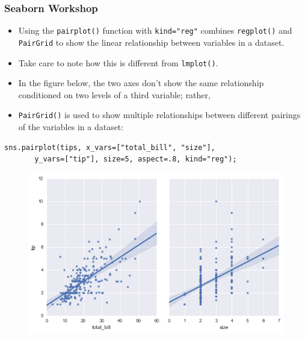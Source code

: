 \documentclass{beamer}
\begin{document}
\begin{frame}[fragile]
	\frametitle{Seaborn Workshop}
	\large
\begin{itemize}
\item Using the \texttt{pairplot()} function with \texttt{kind="reg"} combines \texttt{regplot()} and \texttt{PairGrid} to show the linear relationship between variables in a dataset.
\item Take care to note how this is different from \texttt{lmplot()}. 
\item In the figure below, the two axes don’t show the same relationship conditioned on two levels of a third variable; rather, \item \texttt{PairGrid()} is used to show multiple relationships between different pairings of the variables in a dataset:
\end{itemize}

\end{frame}
\begin{frame}[fragile]
	\large
\begin{verbatim}
sns.pairplot(tips, x_vars=["total_bill", "size"],  
       y_vars=["tip"], size=5, aspect=.8, kind="reg");
\end{verbatim}
\begin{figure}
\centering
\includegraphics[width=0.8\linewidth]{images/regression_53_0}
\end{figure}

\end{frame}
\end{document}
